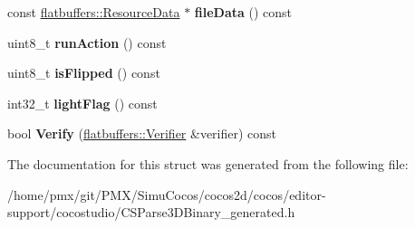 \begin{DoxyCompactItemize}
const \hyperlink{structflatbuffers_1_1ResourceData}{flatbuffers\+::\+Resource\+Data} $\ast$ {\bfseries file\+Data} () const
\item 
\mbox{\label{structflatbuffers_1_1Sprite3DOptions_a076380148419822a0327a09fbac3f823}} 
uint8\+\_\+t {\bfseries run\+Action} () const
\item 
\mbox{\label{structflatbuffers_1_1Sprite3DOptions_af08fefdc49b93cdaae7b6ba77218be71}} 
uint8\+\_\+t {\bfseries is\+Flipped} () const
\item 
\mbox{\label{structflatbuffers_1_1Sprite3DOptions_a3fb73f8a064e4b5f074ad0f1ce6c678a}} 
int32\+\_\+t {\bfseries light\+Flag} () const
\item 
\mbox{\label{structflatbuffers_1_1Sprite3DOptions_a236a44fc9ff801b296b43324bd4f0507}} 
bool {\bfseries Verify} (\hyperlink{classflatbuffers_1_1Verifier}{flatbuffers\+::\+Verifier} \&verifier) const
\end{DoxyCompactItemize}


The documentation for this struct was generated from the following file\+:\begin{DoxyCompactItemize}
\item 
/home/pmx/git/\+P\+M\+X/\+Simu\+Cocos/cocos2d/cocos/editor-\/support/cocostudio/C\+S\+Parse3\+D\+Binary\+\_\+generated.\+h\end{DoxyCompactItemize}

